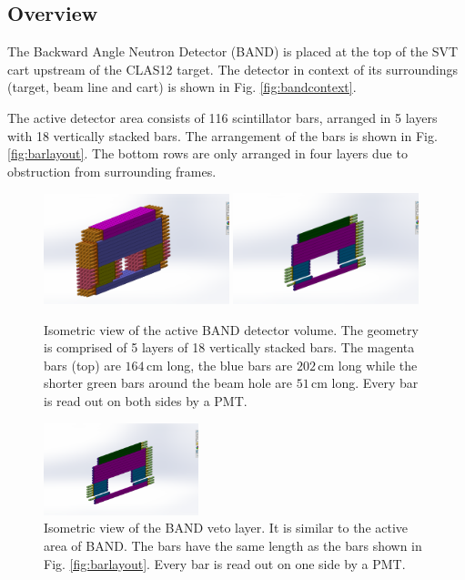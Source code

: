 \documentclass[review]{elsarticle}
\begin{document}
\subsection{Overview}
The Backward Angle Neutron Detector (BAND) is placed at the top of the SVT cart upstream of the CLAS12 target. The detector in context of its surroundings (target, beam line and cart) is shown in Fig. \ref{fig:bandcontext}.
 
The active detector area consists of 116 scintillator bars, arranged in 5 layers with 18 vertically stacked bars. The arrangement of the bars is shown in Fig. \ref{fig:barlayout}. The bottom rows are only arranged in four layers due to obstruction from surrounding frames.
\begin{figure}[htb]
\centering
\includegraphics[width=0.48\textwidth]{Band01.png}
  \includegraphics[width=0.48\textwidth]{BandVeto.png}
 \caption {Isometric view of the active BAND detector volume. The geometry is comprised of 5 layers of 18 vertically stacked bars. The magenta bars (top) are $164\,\mathrm{cm}$ long, the blue bars are $202\,\mathrm{cm}$ long while the shorter green bars around the beam hole are $51\,\mathrm{cm}$ long. Every bar is read out on both sides by a PMT.}
  \label{fig:barlayout}
  \includegraphics[width=0.40\textwidth]{BandVeto.png}
 \caption {Isometric view of the BAND veto layer. It is similar to the active area of BAND. The bars have the same length as the bars shown in Fig. \ref{fig:barlayout}. Every bar is read out on one side by a PMT.}
  \label{fig:vetolayout}
\end{figure}
\end{document}
